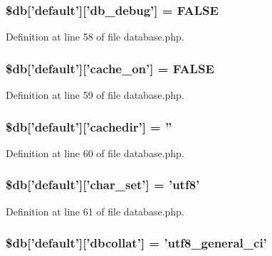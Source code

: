 \subsubsection[{\$db}]{\setlength{\rightskip}{0pt plus 5cm}\$db['default']['db\-\_\-debug'] = F\-A\-L\-S\-E}\label{production_2database_8php_aa79c6a73d78063a2b2ee6903a9851908}


Definition at line 58 of file database.\-php.

\subsubsection[{\$db}]{\setlength{\rightskip}{0pt plus 5cm}\$db['default']['cache\-\_\-on'] = F\-A\-L\-S\-E}\label{production_2database_8php_a05a82adb11460f351c1df4ae9be71866}


Definition at line 59 of file database.\-php.

\subsubsection[{\$db}]{\setlength{\rightskip}{0pt plus 5cm}\$db['default']['cachedir'] = ''}\label{production_2database_8php_a12683252490249e3294aebaca97c4126}


Definition at line 60 of file database.\-php.

\subsubsection[{\$db}]{\setlength{\rightskip}{0pt plus 5cm}\$db['default']['char\-\_\-set'] = 'utf8'}\label{production_2database_8php_a581bc2f1f3fa806239c44e2c2293dc59}


Definition at line 61 of file database.\-php.

\subsubsection[{\$db}]{\setlength{\rightskip}{0pt plus 5cm}\$db['default']['dbcollat'] = 'utf8\-\_\-general\-\_\-ci'}\label{production_2database_8php_ab03697bf8340acfa74bf20c952aa81c7}


